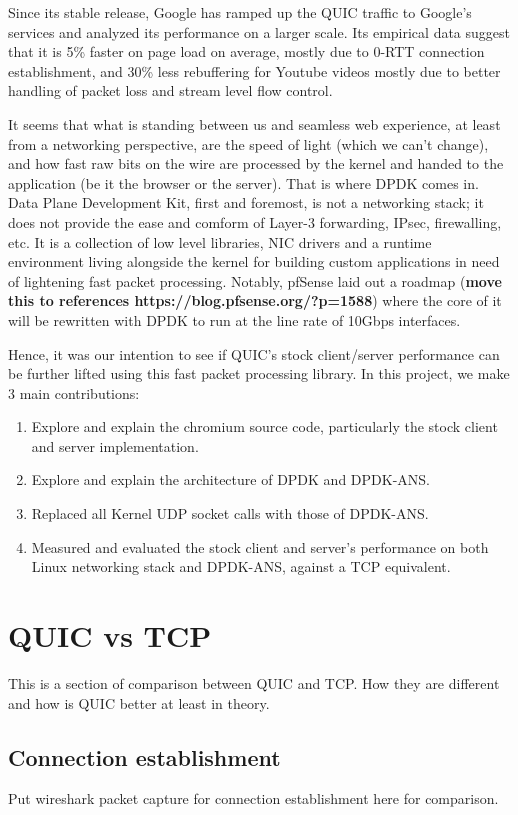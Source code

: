 \documentclass{sig-alternate-05-2015}
\begin{document}
Since its stable release, Google has ramped up the QUIC traffic to Google's services and analyzed its performance on a larger scale. Its empirical data suggest that it is 5\% faster on page load on average, mostly due to 0-RTT connection establishment, and 30\% less rebuffering for Youtube videos mostly due to better handling of packet loss and stream level flow control.

It seems that what is standing between us and seamless web experience, at least from a networking perspective, are the speed of light (which we can't change), and how fast raw bits on the wire are processed by the kernel and handed to the application (be it the browser or the server). That is where DPDK comes in. Data Plane Development Kit, first and foremost, is not a networking stack; it does not provide the ease and comform of Layer-3 forwarding, IPsec, firewalling, etc. It is a collection of low level libraries, NIC drivers and a runtime environment living alongside the kernel for building custom applications in need of lightening fast packet processing. Notably, pfSense laid out a roadmap (\textbf{move this to references https://blog.pfsense.org/?p=1588}) where the core of it will be rewritten with DPDK to run at the line rate of 10Gbps interfaces. 

Hence, it was our intention to see if QUIC's stock client/server performance can be further lifted using this fast packet processing library. In this project, we make 3 main contributions:

\begin{enumerate}
	\item Explore and explain the chromium source code, particularly the stock client and server implementation.
	\item Explore and explain the architecture of DPDK and DPDK-ANS.
	\item Replaced all Kernel UDP socket calls with those of DPDK-ANS.
	\item Measured and evaluated the stock client and server's performance on both Linux networking stack and DPDK-ANS, against a TCP equivalent.
\end{enumerate}

\section{QUIC vs TCP}
This is a section of comparison between QUIC and TCP. How they are different and how is QUIC better at least in theory.

\subsection{Connection establishment}
Put wireshark packet capture for connection establishment here for comparison.
\end{document}
